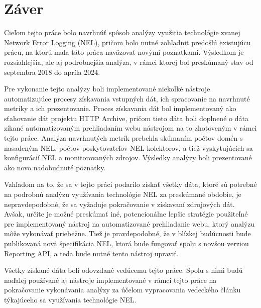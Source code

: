 \chapter{Záver}
\label{zaver}

Cieľom tejto práce bolo navrhnúť spôsob analýzy využitia technológie zvanej Network Error Logging (NEL), pričom bolo nutné zohľadniť predošlú existujúcu prácu, na ktorú mala táto práca naväzovať novými poznatkami.
Výsledkom je rozsiahlejšia, ale aj podrobnejšia analýza, v rámci ktorej bol preskúmaný stav od septembra 2018 do apríla 2024.

Pre vykonanie tejto analýzy boli implementované niekoľké nástroje automatizujúce procesy získavania vstupných dát, ich spracovanie na navrhnuté metriky a ich prezentovanie.
Proces získavania dát bol implementovaný ako sťahovanie dát projektu HTTP Archive, pričom tieto dáta boli doplnené o dáta zíkané automatizovaným prehliadaním webu nástrojom na to zhotoveným v rámci tejto práce. 
Analýza navrhnutých metrík prebehla skúmaním počtov domén s nasadeným NEL, počtov poskytovateľov NEL kolektorov, a tiež vyskytujúcich sa konfigurácií NEL a monitorovaných zdrojov.
Výsledky analýzy boli prezentované ako novo nadobudnuté poznatky.

Vzhľadom na to, že sa v tejto práci podarilo získať všetky dáta, ktoré sú potrebné na podrobnú analýzu využívania technológie NEL za preskúmané obdobie, je nepravdepodobné, že sa vyžaduje pokračovanie v získavaní zdrojových dát.
Avšak, určite je možné preskúmať iné, potencionálne lepšie stratégie použiteľné pre implementovaný nástroj na automatizované prehliadanie webu, ktorý analýzu môže vykonávať priebežne.
Tiež je pravdepodobné, že v blízkej budúcnosti bude publikovaná nová špecifikácia NEL, ktorá bude fungovať spolu s novšou verziou Reporting API, a teda bude nutné tento nástroj upraviť.

Všetky získané dáta boli odovzdané vedúcemu tejto práce.
Spolu s nimi budú naďalej používané aj nástroje implementované v rámci tejto práce na pokračovanie vykonávania analýzy za účelom vypracovania vedeckého článku týkajúceho sa využívania technológie NEL. 
